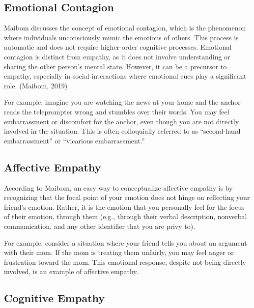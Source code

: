 \documentclass[stu]{apa7}
\begin{document}
\subsection{Emotional Contagion}

Maibom discusses the concept of emotional contagion, which is the phenomenon where individuals unconsciously mimic the emotions of others. This process is automatic and does not require higher-order cognitive processes. Emotional contagion is distinct from empathy, as it does not involve understanding or sharing the other person's mental state. However, it can be a precursor to empathy, especially in social interactions where emotional cues play a significant role. (Maibom, 2019)

For example, imagine you are watching the news at your home and the anchor reads the teleprompter wrong and stumbles over their words. You may feel embarrassment or discomfort for the anchor, even though you are not directly involved in the situation. This is often colloquially referred to as ``second-hand embarrassment'' or ``vicarious embarrassment.''

\subsection{Affective Empathy}

According to Maibom, an easy way to conceptualize affective empathy is by recognizing that the focal point of your emotion does not hinge on reflecting your friend's emotion. Rather, it is the emotion that you personally feel for the focus of their emotion, through them (e.g., through their verbal description, nonverbal communication, and any other identifier that you are privy to).

For example, consider a situation where your friend tells you about an argument with their mom. If the mom is treating them unfairly, you may feel anger or frustration toward the mom. This emotional response, despite not being directly involved, is an example of affective empathy.

\subsection{Cognitive Empathy}



\end{document}
